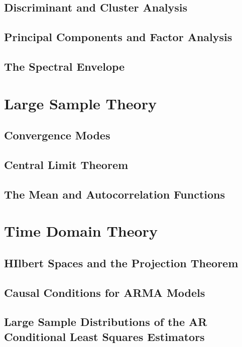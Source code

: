 \documentclass[12pt]{article}
\begin{document}
\subsection{Discriminant and Cluster Analysis}

\subsection{Principal Components and Factor Analysis}

\subsection{The Spectral Envelope}


\section{Large Sample Theory}
\subsection{Convergence Modes}

\subsection{Central Limit Theorem}

\subsection{The Mean and Autocorrelation Functions}


\section{Time Domain Theory}
\subsection{HIlbert Spaces and the Projection Theorem}

\subsection{Causal Conditions for ARMA Models}

\subsection{Large Sample Distributions of the AR Conditional Least Squares Estimators}
\end{document}
